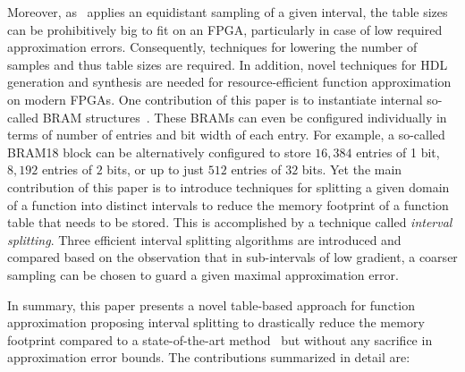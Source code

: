 Moreover,  as~\cite{MATLAB:reference} applies an equidistant sampling of a given interval, the table sizes can be prohibitively big to fit on an \ac{FPGA}, particularly in case of low required approximation errors.
Consequently, techniques for lowering the number of samples and thus table sizes are required.
In addition, novel techniques for \ac{HDL} generation and synthesis are needed for resource-efficient function approximation on modern \acp{FPGA}. 
One contribution of this paper is to instantiate internal so-called \ac{BRAM} structures~\cite{bramXilinx}.
These \acp{BRAM} can even be configured individually in terms of number of entries and bit width of each entry. 
For example, a so-called BRAM18 block can be alternatively configured to store $16,384$ entries of 1 bit, $8,192$ entries of $2$ bits, or up to just $512$ entries of $32$ bits.
Yet the main contribution of this paper is to introduce techniques for splitting a given domain of a function into distinct intervals to reduce the memory footprint of a function table that needs to be stored. 
This is accomplished by a technique called {\em interval splitting}. 
Three efficient interval splitting algorithms are introduced and compared based on the observation that in sub-intervals of low gradient, a coarser sampling can be chosen to guard a given maximal approximation error.\par
In summary, this paper presents a novel table-based approach for function approximation proposing interval splitting to drastically reduce the memory footprint compared to a state-of-the-art method~\cite{MATLAB:reference} but without any sacrifice in approximation error bounds. 
The contributions summarized in detail are: 
